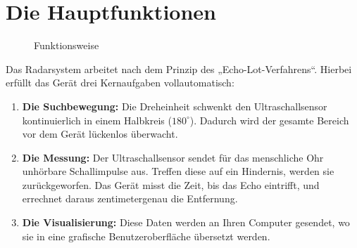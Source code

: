 %
%

\chapter{Die Hauptfunktionen}

\begin{figure}[h]
	\centering
	
	\caption{Funktionsweise}
\end{figure}


Das Radarsystem arbeitet nach dem Prinzip des „Echo-Lot-Verfahrens“. Hierbei erfüllt das Gerät drei Kernaufgaben vollautomatisch:

\begin{enumerate}
	\item \textbf{Die Suchbewegung:} Die Dreheinheit schwenkt den Ultraschallsensor kontinuierlich in einem Halbkreis ($180^\circ$). Dadurch wird der gesamte Bereich vor dem Gerät lückenlos überwacht.
	\item \textbf{Die Messung:} Der Ultraschallsensor sendet für das menschliche Ohr unhörbare Schallimpulse aus. Treffen diese auf ein Hindernis, werden sie zurückgeworfen. Das Gerät misst die Zeit, bis das Echo eintrifft, und errechnet daraus zentimetergenau die Entfernung.
	\item \textbf{Die Visualisierung:} Diese Daten werden an Ihren Computer gesendet, wo sie in eine grafische Benutzeroberfläche übersetzt werden.
\end{enumerate}
